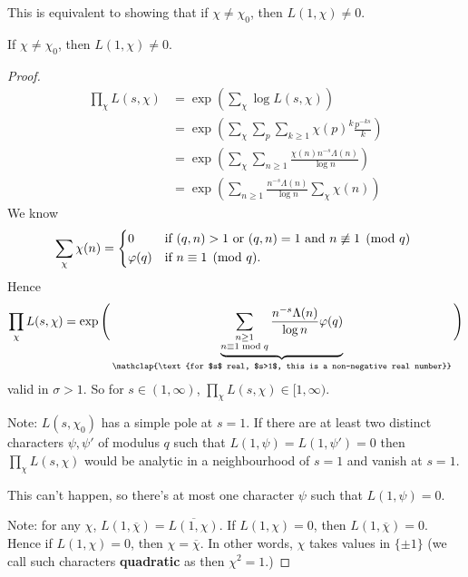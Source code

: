\documentclass{article}
\newcommand{\1}{\mathbbm{1}}
\begin{document}
This is equivalent to showing that if $\chi \neq \chi_0$, then $L(1,\chi) \neq 0$.
\begin{thm}
  If $\chi \neq \chi_0$, then $L(1,\chi)\neq0$.
\end{thm}
\begin{proof}
  \begin{align*}
    \prod_\chi L(s,\chi) &= \exp(\sum_\chi \log L(s,\chi)) \\
                         &= \exp\left(\sum_\chi \sum_p \sum_{k \geq 1} \chi(p)^k \frac{p^{-ks}}{k}\right) \\
                         &= \exp(\sum_\chi \sum_{n \geq 1} \frac{\chi(n) n^{-s} \Lambda(n)}{\log n}) \\
                         &= \exp\left(\sum_{n \geq 1} \frac{n^{-s} \Lambda(n)}{\log n} \sum_\chi \chi(n)\right)
  \end{align*}
  We know
  \begin{align*}
    \sum_\chi \chi(n) =
    \begin{cases*}
      0 & if $(q,n) > 1$ or $(q,n) = 1$ and $n \not\equiv 1 \pmod{q}$ \\
      \varphi(q) & if $n \equiv 1 \pmod{q}$.
    \end{cases*}
  \end{align*}
  Hence
  \begin{align*}
    \prod_\chi L(s,\chi) = \exp\Bigg(\underbrace{\sum_{\substack{n \geq 1 \\  n \equiv 1 \bmod{q}}} \frac{n^{-s} \Lambda(n)}{\log n} \varphi(q)}_{\mathclap{\text{for $s$ real, $s>1$, this is a non-negative real number}}}\Bigg)
  \end{align*}
  valid in $\sigma > 1$.
  So for $s \in (1,\infty)$, $\prod_\chi L(s,\chi) \in [1,\infty)$. %

  Note: $L(s,\chi_0)$ has a simple pole at $s=1$. If there are at least two distinct characters $\psi,\psi'$ of modulus $q$ such that $L(1,\psi) = L(1,\psi') = 0$ then
  $\prod_\chi L(s,\chi)$ would be analytic in a neighbourhood of $s=1$ and vanish at $s=1$.

  This can't happen, so there's at most one character $\psi$ such that $L(1,\psi) = 0$.

  Note: for any $\chi$, $L(1,\overline{\chi}) = \overline{L(1,\chi)}$.
  If $L(1,\chi) = 0$, then $L(1,\overline{\chi}) = 0$.
  Hence if $L(1,\chi) = 0$, then $\chi = \overline{\chi}$.
  In other words, $\chi$ takes values in $\{\pm 1\}$ (we call such characters \textbf{quadratic} as then $\chi^2 = 1$.)


\end{proof}
\end{document}
